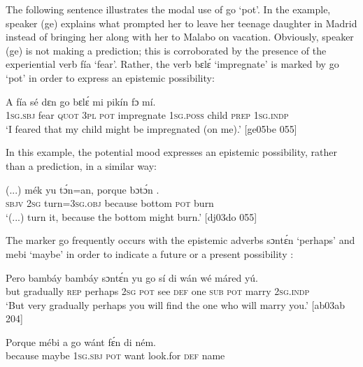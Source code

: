 The following sentence illustrates the modal use of go ‘pot’. In the example, speaker (ge) explains what prompted her to leave her teenage daughter in Madrid instead of bringing her along with her to Malabo on vacation. Obviously, speaker (ge) is not making a prediction; this is corroborated by the presence of the experiential verb fía ‘fear’. Rather, the verb bɛlɛ́ ‘impregnate’ is marked by go ‘pot’ in order to express an epistemic possibility:  



\ea%
    \label{ex:key:442}
    \gll A    fía  sé    dɛn  go  bɛlɛ́      mi    pikín  fɔ  mí.\\
\textsc{1sg.sbj}  fear  \textsc{quot}    \textsc{3pl}  \textsc{pot}  impregnate  \textsc{1sg.poss}  child  \textsc{prep}  \textsc{1sg.indp}\\

\glt ‘I feared that my child might be impregnated (on me).’ [ge05be 055]
\z

In this example, the potential mood expresses an epistemic possibility, rather than a prediction, in a similar way: 


\ea%
    \label{ex:key:443}
    \gll (...)  mék    yu  tɔ́n=an,    porque  bɔtɔ́n    .\\
  {} \textsc{sbjv}    \textsc{2sg}  turn=\textsc{3sg.obj}  because  bottom  \textsc{pot}  burn\\

\glt ‘(...) turn it, because the bottom might burn.’ [dj03do 055]
\z

The marker go frequently occurs with the epistemic adverbs sɔntɛ́n ‘perhaps’ and mebi ‘maybe’ in order to indicate a future  or a present possibility : 


\ea%
    \label{ex:key:444}
    \gll Pero    bambáy     bambáy  sɔntɛ́n  yu  go  sí  di  wán
wé    máred  yú.  \\
but    gradually  \textsc{rep}    perhaps  \textsc{2sg}  \textsc{pot}  see  \textsc{def}  one  
\textsc{sub}  \textsc{pot}  marry  \textsc{2sg.indp}\\

\glt ‘But very gradually perhaps you will find the one who will marry you.’ [ab03ab 204]
\z


\ea%
    \label{ex:key:445}
    \gll Porque  mébi  a    go  wánt  fɛ́n    di  ném.\\
because  maybe  \textsc{1sg.sbj}  \textsc{pot}  want  look.for  \textsc{def}  name\\


